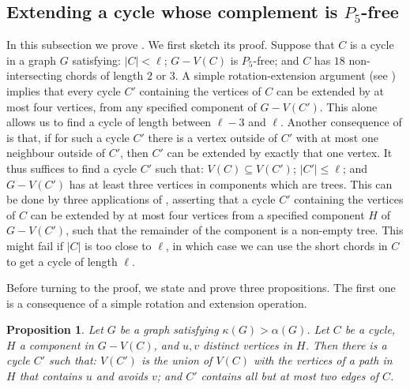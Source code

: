 \documentclass[11pt,english]{article}
\theoremstyle{plain}
\newtheorem{proposition}[theorem]{Proposition}
\theoremstyle{definition}
\theoremstyle{remark}
\begin{document}
	\subsection{Extending a cycle whose complement is $P_5$-free}

		In this subsection we prove . We first sketch its proof. Suppose that $C$ is a cycle in a graph $G$ satisfying: $|C| < \ell$; $G - V(C)$ is $P_5$-free; and $C$ has $18$ non-intersecting chords of length $2$ or $3$. A simple rotation-extension argument (see ) implies that every cycle $C'$ containing the vertices of $C$ can be extended by at most four vertices, from any specified component of $G - V(C')$. This alone allows us to find a cycle of length between $\ell-3$ and $\ell$. Another consequence of  is that, if for such a cycle $C'$ there is a vertex outside of $C'$ with at most one neighbour outside of $C'$, then $C'$ can be extended by exactly that one vertex. It thus suffices to find a cycle $C'$ such that: $V(C) \subseteq V(C')$; $|C'| \le \ell$; and $G - V(C')$ has at least three vertices in components which are trees. This can be done by three applications of , asserting that a cycle $C'$ containing the vertices of $C$ can be extended by at most four vertices from a specified component $H$ of $G - V(C')$, such that the remainder of the component is a non-empty tree. This might fail if $|C|$ is too close to $\ell$, in which case we can use the short chords in $C$ to get a cycle of length $\ell$.

		Before turning to the proof, we state and prove three propositions.
		The first one is a consequence of a simple rotation and extension operation. 

		\begin{proposition} \label{prop:cycle-extension}
			Let $G$ be a graph satisfying $\kappa(G) > \alpha(G)$.
			Let $C$ be a cycle, $H$ a component in $G - V(C)$, and $u,v$ distinct vertices in $H$.
			Then there is a cycle $C'$ such that: $V(C')$ is the union of $V(C)$ with the vertices of a path in $H$ that contains $u$ and avoids $v$; and $C'$ contains all but at most two edges of $C$. 
		\end{proposition}
\end{document}
